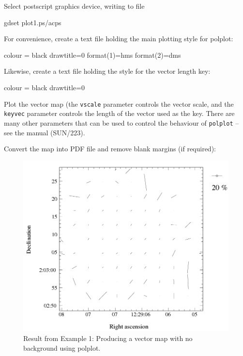 Select postscript graphics device, writing to file 

\begin{terminalv}
gdset plot1.ps/acps
\end{terminalv}

For convenience, create a text file holding the main plotting style for polplot:

\begin{terminalv}
colour = black
drawtitle=0
format(1)=hms
format(2)=dms
\end{terminalv}

Likewise, create a text file holding the style for the vector length key:

\begin{terminalv}
colour = black
drawtitle=0
\end{terminalv}


Plot the vector map (the \texttt{vscale} parameter controls the vector
scale, and the \texttt{keyvec} parameter controls the length of the
vector used as the key. There are many other parameters that can be
used to control the behaviour of \texttt{polplot} -- see the \polpack
manual (SUN/223).

\begin{terminalv}
\end{terminalv}

Convert the map into PDF file and remove blank margins (if required):

\begin{terminalv}
\end{terminalv}


\begin{figure}[t!]
\begin{center}
\includegraphics[width=0.75\linewidth]{sc22-kappa-plots-plot1.png}
\caption [Vector map with polplot]{ Result from Example 1: Producing a
  vector map with no background using polplot.}
\label{fig:kappa-plot1}
\end{center}
\end{figure}

